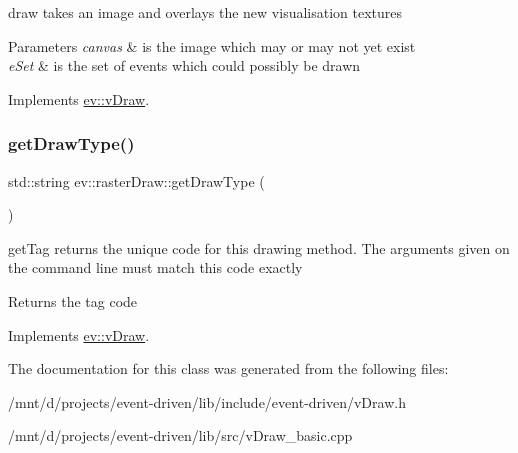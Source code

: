 draw takes an image and overlays the new visualisation textures 


\begin{DoxyParams}{Parameters}
{\em canvas} & is the image which may or may not yet exist \\
\hline
{\em e\+Set} & is the set of events which could possibly be drawn \\
\hline
\end{DoxyParams}


Implements \hyperlink{classev_1_1vDraw_af1eee5dcdf3b4cfee6a3024e5cd706f8}{ev\+::v\+Draw}.

\mbox{\label{classev_1_1rasterDraw_a687569e3beafa6aa9e73e3eeaad64d59}} 
\subsubsection{\texorpdfstring{get\+Draw\+Type()}{getDrawType()}}
{\footnotesize\ttfamily std\+::string ev\+::raster\+Draw\+::get\+Draw\+Type (\begin{DoxyParamCaption}{ }\end{DoxyParamCaption})\hspace{0.3cm}{\ttfamily [virtual]}}



get\+Tag returns the unique code for this drawing method. The arguments given on the command line must match this code exactly 

\begin{DoxyReturn}{Returns}
the tag code 
\end{DoxyReturn}


Implements \hyperlink{classev_1_1vDraw_ac01381befeffef2b930cbceb28b18a28}{ev\+::v\+Draw}.



The documentation for this class was generated from the following files\+:\begin{DoxyCompactItemize}
\item 
/mnt/d/projects/event-\/driven/lib/include/event-\/driven/v\+Draw.\+h\item 
/mnt/d/projects/event-\/driven/lib/src/v\+Draw\+\_\+basic.\+cpp\end{DoxyCompactItemize}
